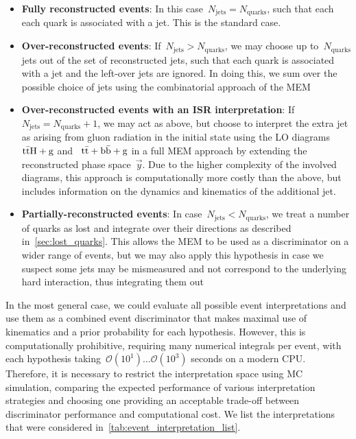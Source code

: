 \begin{itemize}
\item \textbf{Fully reconstructed events}: In this case~$N_{\mathrm{jets}} = N_{\mathrm{quarks}}$, such that each each quark is associated with a jet. This is the standard case.
\item \textbf{Over-reconstructed events}: If~$N_{\mathrm{jets}} > N_{\mathrm{quarks}}$, we may choose up to~$N_{\mathrm{quarks}}$ jets out of the set of reconstructed jets, such that each quark is associated with a jet and the left-over jets are ignored. In doing this, we sum over the possible choice of jets using the combinatorial approach of the MEM
\item \textbf{Over-reconstructed events with an ISR interpretation}: If~$N_{\mathrm{jets}} = N_{\mathrm{quarks}} + 1$, we may act as above, but choose to interpret the extra jet as arising from gluon radiation in the initial state using the LO diagrams~$\mathrm{t} \bar{\mathrm{t}} \mathrm{H} + \mathrm{g}$ and ~$\mathrm{t} \bar{\mathrm{t}} + \mathrm{b}\bar{\mathrm{b}} + \mathrm{g}$ in a full MEM approach by extending the reconstructed phase space~$\vec{y}$. Due to the higher complexity of the involved diagrams, this approach is computationally more costly than the above, but includes information on the dynamics and kinematics of the additional jet.
\item \textbf{Partially-reconstructed events}: In case~$N_{\mathrm{jets}} < N_{\mathrm{quarks}}$, we treat a number of quarks as lost and integrate over their directions as described in~\cref{sec:lost_quarks}. This allows the MEM to be used as a discriminator on a wider range of events, but we may also apply this hypothesis in case we suspect some jets may be mismeasured and not correspond to the underlying hard interaction, thus integrating them out
\end{itemize}

In the most general case, we could evaluate all possible event interpretations and use them as a combined event discriminator that makes maximal use of kinematics and a prior probability for each hypothesis. However, this is computationally prohibitive, requiring many numerical integrals per event, with each hypothesis taking~$\mathcal{O}(10^1)\dots \mathcal{O}(10^3)$ seconds on a modern CPU. Therefore, it is necessary to restrict the interpretation space using MC simulation, comparing the expected performance of various interpretation strategies and choosing one providing an acceptable trade-off between discriminator performance and computational cost. We list the interpretations that were considered in~\cref{tab:event_interpretation_list}.

